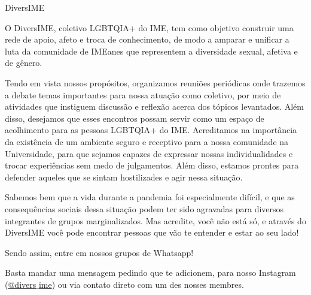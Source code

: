 \begin{subsecao}{DiversIME}

O DiversIME, coletivo LGBTQIA+ do IME, tem como objetivo construir uma rede de
apoio, afeto e troca de conhecimento, de modo a amparar e unificar a luta da
comunidade de IMEanes que representem a diversidade sexual, afetiva e de gênero. 

Tendo em vista nossos propósitos, organizamos reuniões periódicas onde trazemos
a debate temas importantes para nossa atuação como coletivo, por meio de
atividades que instiguem discussão e reflexão acerca dos tópicos levantados.
Além disso, desejamos que esses encontros possam servir como um espaço de
acolhimento para as pessoas LGBTQIA+ do IME. Acreditamos na importância da
existência de um ambiente seguro e receptivo para a nossa comunidade na
Universidade, para que sejamos capazes de expressar nossas individualidades
e trocar experiências sem medo de julgamentos. Além disso, estamos prontes
para defender aqueles que se sintam hostilizades e agir nessa situação. 

Sabemos bem que a vida durante a pandemia foi especialmente difícil, e que as 
consequências sociais dessa situação podem ter sido agravadas para diversos integrantes
de grupos marginalizados. Mas acredite, você não está só, e através do DiversIME
você pode encontrar pessoas que vão te entender e estar ao seu lado!

Sendo assim, entre em nossos grupos de Whatsapp!

Basta mandar uma mensagem pedindo que te adicionem, para nosso Instagram
(\href{https://www.instagram.com/divers_ime/}{@divers$\_$ime}) ou via contato direto 
com um des nosses membres.

\end{subsecao}
